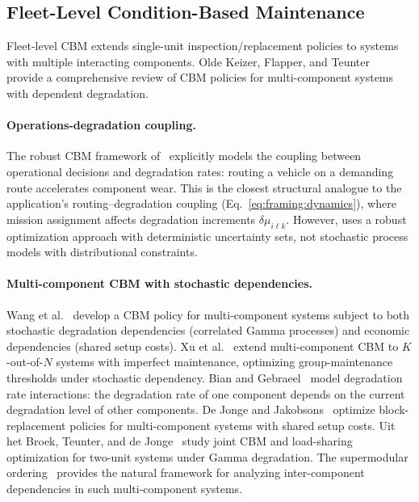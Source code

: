 \documentclass[11pt,a4paper]{article}
\theoremstyle{plain}
\theoremstyle{definition}
\theoremstyle{remark}
\begin{document}
\subsection{Fleet-Level Condition-Based Maintenance}
\label{sec:related:s5}

Fleet-level CBM extends single-unit inspection/replacement policies to systems with multiple interacting components. Olde Keizer, Flapper, and Teunter~\cite{olde2014} provide a comprehensive review of CBM policies for multi-component systems with dependent degradation.

\paragraph{Operations-degradation coupling.}
The robust CBM framework of~\cite{robustCBM2023} explicitly models the coupling between operational decisions and degradation rates: routing a vehicle on a demanding route accelerates component wear. This is the closest structural analogue to the application's routing--degradation coupling (Eq.~\eqref{eq:framing:dynamics}), where mission assignment affects degradation increments $\delta\mu_{i\ell k}$. However, \cite{robustCBM2023} uses a robust optimization approach with deterministic uncertainty sets, not stochastic process models with distributional constraints.

\paragraph{Multi-component CBM with stochastic dependencies.}
Wang et al.~\cite{wang2022cbm} develop a CBM policy for multi-component systems subject to both stochastic degradation dependencies (correlated Gamma processes) and economic dependencies (shared setup costs). Xu et al.~\cite{xu2021} extend multi-component CBM to $K$-out-of-$N$ systems with imperfect maintenance, optimizing group-maintenance thresholds under stochastic dependency. Bian and Gebraeel~\cite{bian2014} model degradation rate interactions: the degradation rate of one component depends on the current degradation level of other components. De Jonge and Jakobsons~\cite{deJonge2020} optimize block-replacement policies for multi-component systems with shared setup costs. Uit het Broek, Teunter, and de Jonge~\cite{uithetbroek2019} study joint CBM and load-sharing optimization for two-unit systems under Gamma degradation. The supermodular ordering~\cite{joe2015,muller2006} provides the natural framework for analyzing inter-component dependencies in such multi-component systems.
\end{document}
